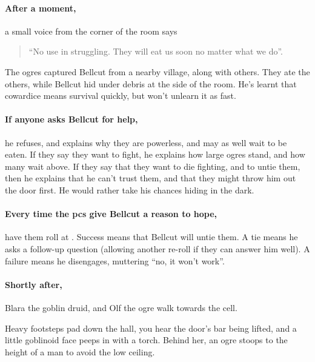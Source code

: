 \begin{multicols}{2}
\paragraph{After a moment,}
a small voice from the corner of the room says

\begin{quotation}
  ``No use in struggling.
  They will eat us soon no matter what we do''.
\end{quotation}

\noindent
The ogres captured Bellcut from a nearby village, along with others.
They ate the others, while Bellcut hid under debris at the side of the room.
He's learnt that cowardice means survival quickly, but won't unlearn it as fast.

\firstPrisoner

\paragraph{If anyone asks Bellcut for help,}
he refuses, and explains why they are powerless, and may as well wait to be eaten.
If they say they want to fight, he explains how large ogres stand, and how many wait above.
If they say that they want to die fighting, and to untie them, then he explains that he can't trust them, and that they might throw him out the door first.
He would rather take his chances hiding in the dark.

\paragraph{Every time the \glspl{pc} give Bellcut a reason to hope,}
have them roll  at \iftoggle{oneshot}{\tn[9]}{\tn[11]}.
Success means that Bellcut will untie them.
A tie means he asks a follow-up question (allowing another re-roll if they can answer him well).
A failure means he disengages, muttering ``no, it won't work''.

\paragraph{Shortly after,}
Blara the goblin druid, and Olf the ogre walk towards the cell.

\begin{boxtext}
  Heavy footsteps pad down the hall, you hear the door's bar being lifted, and a little goblinoid face peeps in with a torch.
  Behind her, an ogre stoops to the height of a man to avoid the low ceiling.
\end{boxtext}


\end{multicols}
